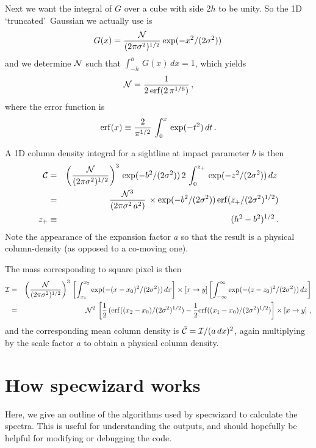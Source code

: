 \documentclass{report}
\begin{document}
Next we want the integral of $G$ over a cube with side $2h$ to be unity. So the 1D \lq truncated\rq\ Gaussian we actually use is
\begin{equation}
G(x) = {{\cal N}\over (2\pi \sigma^2)^{1/2}}\exp(-x^2/(2\sigma^2))\,
\end{equation}
and we determine ${\cal N}$ such that $\int_{-h}^{h}\,G(x)\,dx=1$, which yields
\begin{equation}
{\cal N} = {1\over 2\,{\rm erf}(2\,\pi^{1/6})}\,,
\end{equation}
where the error function is
\begin{equation}
{\rm erf}(x) \equiv {2\over \pi^{1/2}}\,\int_0^x\,\exp(-t^2)\,dt\,.
\end{equation}

A 1D column density integral for a sightline at impact parameter $b$ is then
\begin{eqnarray}
{\cal C} &=& \left({{\cal N}\over (2\pi \sigma^2)^{1/2}}\right)^3\,\exp(-b^2/(2\sigma^2))\,2\,\int_0^{z_+}\,\exp(-z^2/(2\sigma^2))\,dz\,\nonumber\\
&=& {{\cal N}^3\over (2\pi\sigma^2\,a^2)}\,\times \exp(-b^2/(2\sigma^2))\,{\rm erf}(z_+/(2\sigma^2)^{1/2})\nonumber\\
z_+ &\equiv & (h^2-b^2)^{1/2}\,.
\end{eqnarray}
Note the appearance of the expansion factor $a$ so that the result is a physical column-density (as opposed to a co-moving one).


The mass corresponding to square pixel is then
\begin{eqnarray}
{\cal I} &=& \left({{\cal N}\over (2\pi\sigma^2)^{1/2}}\right)^3\,\left[\int_{x_1}^{x_2}\exp(-(x-x_0)^2/(2\sigma^2))\,dx\right]\times\left[x\rightarrow y\right]\left[\int_{-\infty}^\infty \exp(-(z-z_0)^2/(2\sigma^2))\,dz\right]\nonumber\\
&=&{\cal N}^2\,\left[{1\over 2}\,({\rm erf}((x_2-x_0)/(2\sigma^2)^{1/2})-{1\over 2}{\rm erf}((x_1-x_0)/(2\sigma^2)^{1/2})\right]\times\left[x\rightarrow y\right]\,,
\end{eqnarray}
and the corresponding mean column density is $\bar{\cal C}={\cal I}/(a\,dx)^2$, again multiplying by the scale factor $a$ to obtain a physical column density.



\chapter{How specwizard works}
Here, we give an outline of the algorithms used by specwizard to calculate the spectra. This is useful for understanding the outputs, and should hopefully be helpful for modifying or debugging the code.
\end{document}
